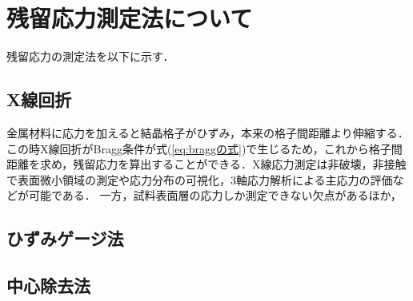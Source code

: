 \section{残留応力測定法について}

残留応力の測定法を以下に示す．

\subsection{X線回折}
金属材料に応力を加えると結晶格子がひずみ，本来の格子間距離より伸縮する．この時X線回折がBragg条件が式(\ref{eq:braggの式})で生じるため，これから格子間距離を求め，残留応力を算出することができる．X線応力測定は非破壊，非接触で表面微小領域の測定や応力分布の可視化，3軸応力解析による主応力の評価などが可能である．
一方，試料表面層の応力しか測定できない欠点があるほか，

\subsection{ひずみゲージ法}

\subsection{中心除去法}
